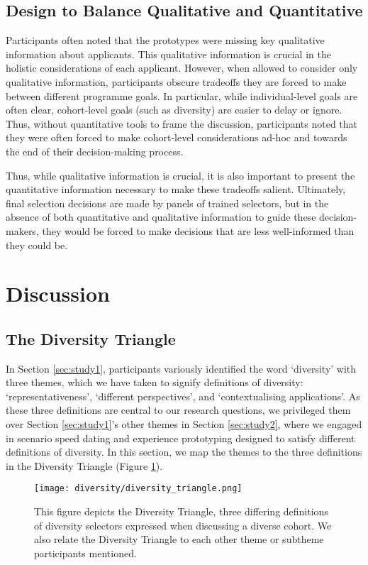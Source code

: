 \subsection{Design to Balance Qualitative and Quantitative}
Participants often noted that the prototypes were missing key qualitative information about applicants. This qualitative information is crucial in the holistic considerations of each applicant. However, when allowed to consider only qualitative information, participants obscure tradeoffs they are forced to make between different programme goals. In particular, while individual-level goals are often clear, cohort-level goals (such as diversity) are easier to delay or ignore. Thus, without quantitative tools to frame the discussion, participants noted that they were often forced to make cohort-level considerations ad-hoc and towards the end of their decision-making process.

Thus, while qualitative information is crucial, it is also important to present the quantitative information necessary to make these tradeoffs salient. Ultimately, final selection decisions are made by panels of trained selectors, but in the absence of both quantitative and qualitative information to guide these decision-makers, they would be forced to make decisions that are less well-informed than they could be.

\section{Discussion}\label{sec:divdisc}
\subsection{The Diversity Triangle}
In Section \ref{sec:study1}, participants variously identified the word `diversity' with three themes, which we have taken to signify definitions of diversity: `representativeness', `different perspectives', and `contextualising applications'. As these three definitions are central to our research questions, we privileged them over Section \ref{sec:study1}'s other themes in Section \ref{sec:study2}, where we engaged in scenario speed dating and experience prototyping designed to satisfy different definitions of diversity. In this section, we map the themes to the three definitions in the Diversity Triangle (Figure \ref{fig:div_triangle}).

\begin{figure}[htbp]
    \centering
    \texttt{[image: diversity/diversity\_triangle.png]}
    \caption{This figure depicts the Diversity Triangle, three differing definitions of diversity selectors expressed when discussing a diverse cohort. We also relate the Diversity Triangle to each other theme or subtheme participants mentioned.}
    \label{fig:div_triangle}
\end{figure}

